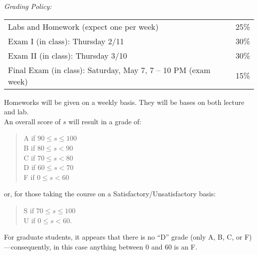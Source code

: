 \documentclass[11pt]{article}
\begin{document}



\emph{Grading Policy:} 
\begin{table}[htdp]
\begin{tabular}{ll}


Labs and Homework (expect one per week) & 25\%\\
Exam I  (in class):  Thursday 2/11 & 30\%\\
Exam II  (in class): Thursday 3/10 & 30\%\\
Final Exam (in class): Saturday, May 7, 7 -- 10 PM (exam week) & 15\%\\
\end{tabular}
\label{default}
\end{table}%

Homeworks will be given on a weekly basis. They will be bases on both lecture and lab. \\

An overall score of $s$ will result in a grade of:
\begin{quote}
A if $90\leq s\leq 100$ \\
B if $80\leq s < 90$ \\
C if $70\leq s < 80$ \\
D if $60\leq s < 70$ \\
F if $0\leq s < 60$
\end{quote}
or, for those taking the course on a Satisfactory/Unsatisfactory basis:
\begin{quote}
S if $70\leq s\leq 100$ \\
U if $0\leq s < 60$.
\end{quote}
For graduate students, it appears that there is no ``D'' grade (only A, B, C, or F)---consequently, in this case anything between $0$ and $60$ is an F. \\
\end{document}
